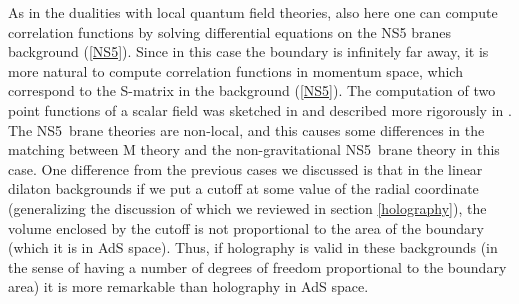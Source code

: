 As in the dualities with local quantum field theories, also here one
can compute correlation functions by solving differential equations on
the NS5 branes background (\ref{NS5}). Since in this case the boundary
is infinitely far away, it is more natural to compute correlation
functions in momentum space, which correspond to the S-matrix in the
background (\ref{NS5}). The computation of two point functions 
of a scalar field was sketched in \cite{Aharony:1998ub} and described
more rigorously in \cite{Minwalla:1999xi}.
The NS5~brane theories are non-local, and this
causes some differences in the matching between M theory and the
non-gravitational NS5~brane theory in this case. One difference
from the previous cases we discussed is that in the linear dilaton
backgrounds if we put a cutoff at some value of the radial coordinate
(generalizing the discussion of \cite{Susskind:1998dq} which we
reviewed in section \ref{holography}), the volume enclosed by the
cutoff is not proportional to the area of the boundary (which it is in
AdS space). Thus, if holography is valid in these backgrounds (in the
sense of having a number of degrees of freedom proportional to the
boundary area) it is more remarkable than holography in AdS space.



